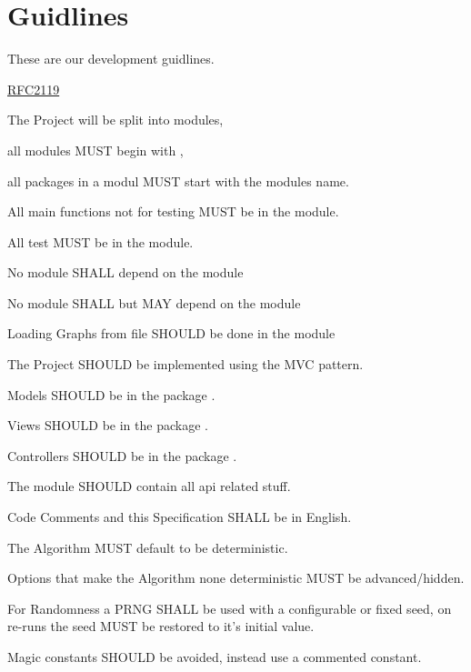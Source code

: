 \section{Guidlines}

These are our development guidlines.

\href{https://www.ietf.org/rfc/rfc2119.txt}{RFC2119}

\begin{list}{-}{}
\item The Project will be split into modules,

all modules MUST begin with \basemodule,

all packages in a modul MUST start with the modules name.

\item All main functions not for testing MUST be in the \basemodule[.main] module.

\item All test MUST be in the \basemodule[.test] module.

\item No module SHALL depend on the module \basemodule[.test]

\item No module SHALL but \basemodule[.test] MAY depend on the module \basemodule[.main]

\item Loading Graphs from file SHOULD be done in the \basemodule[.file] module

\item The Project SHOULD be implemented using the MVC pattern.

\item Models SHOULD be in the package \basemodule[.modle].

\item Views SHOULD be in the package \basemodule[.view].

\item Controllers SHOULD be in the package \basemodule[.control].

\item The module \basemodule[.api] SHOULD contain all api related stuff. %

\item Code Comments and this Specification SHALL be in English.

\item The Algorithm MUST default to be deterministic.

\item Options that make the Algorithm none deterministic MUST be advanced/hidden.

\item For Randomness a PRNG SHALL be used with a configurable or fixed seed,
on re-runs the seed MUST be restored to it's initial value.

\item Magic constants SHOULD be avoided, instead use a commented constant.
\end{list}
